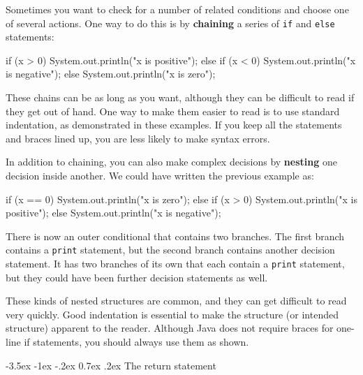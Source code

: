 \documentclass[12pt]{book}
\makeatletter
\renewcommand{\section}{\@startsection {section}{1}{\z@}%
    {-3.5ex \@plus -1ex \@minus -.2ex}%
    {0.7ex \@plus.2ex}%
    {\normalfont\Large\bfseries}}
\theoremstyle{exercise}
\newcommand{\java}[1]{\lstinline{#1}} %
\makeatother
\begin{document}

Sometimes you want to check for a number of related conditions and choose one of several actions.
One way to do this is by {\bf chaining} a series of \java{if} and \java{else} statements:

\begin{code}
    if (x > 0) {
        System.out.println("x is positive");
    } else if (x < 0) {
        System.out.println("x is negative");
    } else {
        System.out.println("x is zero");
    }
\end{code}

These chains can be as long as you want, although they can be difficult to read if they get out of hand.
One way to make them easier to read is to use standard indentation, as demonstrated in these examples.
If you keep all the statements and braces lined up, you are less likely to make syntax errors.


In addition to chaining, you can also make complex decisions by {\bf nesting} one decision inside another.
We could have written the previous example as:

\begin{code}
    if (x == 0) {
        System.out.println("x is zero");
    } else {
        if (x > 0) {
            System.out.println("x is positive");
        } else {
            System.out.println("x is negative");
        }
    }
\end{code}

There is now an outer conditional that contains two branches.
The first branch contains a \java{print} statement, but the second branch contains another decision statement.
It has two branches of its own that each contain a \java{print} statement, but they could have been further decision statements as well.

These kinds of nested structures are common, and they can get difficult to read very quickly.
Good indentation is essential to make the structure (or intended structure) apparent to the reader.
Although Java does not require braces for one-line if statements, you should always use them as shown.


\section{The return statement}

\end{document}
